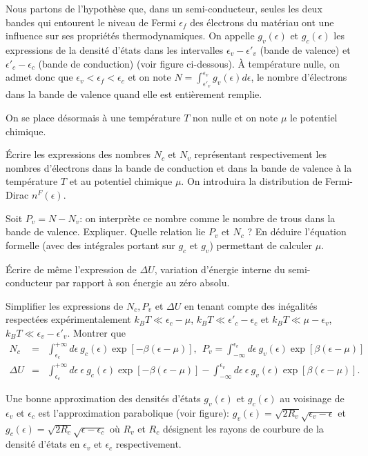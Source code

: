 Nous partons de l'hypothèse que, dans un semi-conducteur, seules les deux bandes qui entourent le niveau de Fermi $\epsilon_f$ des électrons du matériau ont une influence sur ses propriétés thermodynamiques. On appelle $g_v(\epsilon)$ et $g_c(\epsilon)$ les expressions de la densité d'états dans les intervalles $\epsilon_v-\epsilon'_v$ (bande de valence) et 
$\epsilon'_c-\epsilon_c$ (bande de conduction) (voir figure ci-dessous). \`A température nulle, on admet donc que $\epsilon_v < \epsilon_f < \epsilon_c$ et on note $N=\int_{\epsilon'_v}^{\epsilon_v} g_v(\epsilon) d\epsilon$, le nombre d'électrons dans la bande de valence quand elle est entièrement remplie.


On se place désormais à une température $T$ non nulle et on note $\mu$ le potentiel chimique.


\question \'Ecrire les expressions des nombres $N_c$ et $N_v$ représentant respectivement les nombres d'électrons dans la bande de conduction et dans la bande de valence à la température $T$ et au potentiel chimique $\mu$. On introduira la distribution de Fermi-Dirac $n^F(\epsilon)$.

\question Soit $P_v=N-N_v$: on interprète ce nombre comme le nombre de trous dans la bande de valence. Expliquer. Quelle relation lie $P_v$ et $N_c$ ? En déduire l'équation formelle (avec des intégrales portant sur $g_c$ et $g_v$) permettant de calculer $\mu$.

\question \'Ecrire de même l'expression de $\Delta U$, variation d'énergie interne du semi-conducteur par rapport à son énergie au zéro absolu. 

\question Simplifier les expressions de $N_c,P_v$ et $\Delta U$ en tenant compte des inégalités respectées expérimentalement $k_B T \ll \epsilon_c - \mu $, $k_B T \ll \epsilon'_c-\epsilon_c$  et $k_B T \ll \mu - \epsilon_v$, $k_B T \ll \epsilon_v-\epsilon'_v$. 
Montrer que 
\begin{eqnarray}
N_c &=&  \int_{\epsilon_c}^{+\infty} d\epsilon \ g_c(\epsilon) \exp[-\beta(\epsilon-\mu)], \ \ P_v = \int^{\epsilon_v}_{-\infty} d\epsilon \ g_v(\epsilon) \exp[\beta(\epsilon-\mu)] \nonumber \\
\Delta U &=& \int_{\epsilon_c}^{+\infty} d\epsilon \ \epsilon \ g_c(\epsilon) \exp[-\beta(\epsilon-\mu)]-\int^{\epsilon_v}_{-\infty} d\epsilon \ \epsilon \ g_v(\epsilon) \exp[\beta(\epsilon-\mu)]. \nonumber
\end{eqnarray}


Une bonne approximation des densités d'états $g_v(\epsilon)$ et $g_c(\epsilon)$ au voisinage de $\epsilon_v$ et $\epsilon_c$ est l'approximation parabolique (voir figure): $g_v(\epsilon)=\sqrt{2R_v} \sqrt{\epsilon_v-\epsilon}$ et $g_c(\epsilon)=\sqrt{2R_c} \sqrt{\epsilon-\epsilon_c}$ où $R_v$ et $R_c$ désignent les rayons de courbure de la densité d'états  en $\epsilon_v$ et  $\epsilon_c$ respectivement. 

